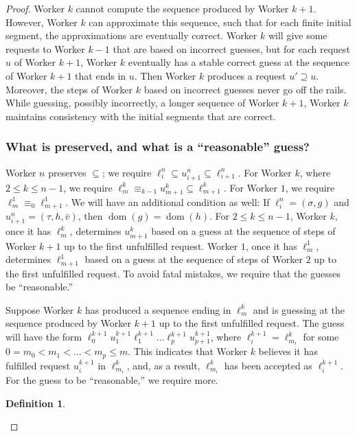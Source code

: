 \documentclass[10pt,a4paper]{article}
\DeclareMathOperator{\dom}{dom}
\theoremstyle{definition}
\newtheorem{defn}[thm]{Definition}
\begin{document}
\begin{proof}
		Worker $k$ cannot compute the sequence produced by Worker $k+1$. However, Worker $k$ can approximate this sequence, such that for each finite initial segment, the approximations are eventually correct. Worker $k$ will give some requests to Worker $k-1$ that are based on incorrect guesses, but for each request $u$ of Worker $k+1$, Worker $k$ eventually has a stable correct guess at the sequence of Worker $k+1$ that ends in $u$. Then Worker $k$ produces a request $u'\supseteq u$. Moreover, the steps of Worker $k$ based on incorrect guesses never go off the rails. While guessing, possibly incorrectly, a longer sequence of Worker $k+1$, Worker $k$ maintains consistency with the initial segments that are correct. 
		
		\subsubsection{What is preserved, and what is a ``reasonable'' guess?}
		
		Worker $n$ preserves $\subseteq$; we require $\ell^n_i\subseteq u^n_{i+1}\subseteq\ell^n_{i+1}$. For Worker $k$, where $2\leq k\leq n-1$, we require $\ell^k_m\equiv_{k-1}u^k_{m+1}\subseteq\ell^k_{m+1}$. For Worker $1$, we require $\ell^1_m\equiv_0\ell^1_{m+1}$. We will have an additional condition as well: If $\ell^n_i = (\sigma,g)$ and $u^n_{i+1} = (\tau,h,\bar{v})$, then $\dom(g) = \dom(h)$. For $2\leq k\leq n-1$, Worker $k$, once it has $\ell^k_m$, determines $u^k_{m+1}$ based on a guess at the sequence of steps of Worker $k+1$ up to the first unfulfilled request. Worker $1$, once it has $\ell^1_m$, determines $\ell^1_{m+1}$ based on a guess at the sequence of steps of Worker $2$ up to the first unfulfilled request. To avoid fatal mistakes, we require that the guesses be ``reasonable.'' 
		
		Suppose Worker $k$ has produced a sequence ending in $\ell^k_m$ and is guessing at the sequence produced by Worker $k+1$ up to the first unfulfilled request. The guess will have the form $\ell^{k+1}_0u^{k+1}_1\ell^{k+1}_1\ldots\ell^{k+1}_p u^{k+1}_{p+1}$, where $\ell^{k+1}_i = \ell^k_{m_i}$ for some $0 = m_0 < m_1 < \ldots < m_p\leq m$. This indicates that Worker $k$ believes it has fulfilled request $u^{k+1}_i$ in $\ell^k_{m_i}$, and, as a result, $\ell^k_{m_i}$ has been accepted as $\ell^{k+1}_i$.  For the guess to be ``reasonable,'' we require more.
		
		\begin{defn}\ 
			
			\begin{enumerate}
				

\end{enumerate}
\end{defn}
\end{proof}
\end{document}
